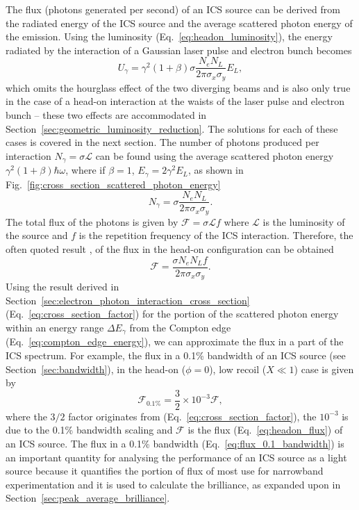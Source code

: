 \documentclass[../main.tex]{subfiles}
\begin{document}
The flux (photons generated per second) of an ICS source can be derived from the radiated energy of the ICS source and the average scattered photon energy of the emission. Using the luminosity (Eq.~\ref{eq:headon_luminosity}), the energy radiated by the interaction of a Gaussian laser pulse and electron bunch becomes  
\begin{equation}
U_{\gamma} = \gamma^{2}\left(1+\beta\right)\sigma\frac{N_{e}N_{L}}{2\pi\sigma_{x}\sigma_{y}}E_{L},
\label{eq:total_interaction_energy_simplified}
\end{equation}
which omits the hourglass effect of the two diverging beams and is also only true in the case of a head-on interaction at the waists of the laser pulse and electron bunch -- these two effects are accommodated in Section~\ref{sec:geometric_luminosity_reduction}. The solutions for each of these cases is covered in the next section. The number of photons produced per interaction $N_{\gamma}=\sigma\mathcal{L}$ can be found using the average scattered photon energy $\gamma^{2}\left(1+\beta\right)\hbar\omega$, where if $\beta=1$, $E_{\gamma} = 2\gamma^{2}E_{L}$, as shown in Fig.~\ref{fig:cross_section_scattered_photon_energy} 
\begin{equation}
N_{\gamma} = \sigma\frac{N_{e}N_{L}}{2\pi\sigma_{x}\sigma_{y}}.
\label{eq:no_photon_headon}
\end{equation}
The total flux of the photons is given by $\mathcal{F} = \sigma\mathcal{L}f$ where $\mathcal{L}$ is the luminosity of the source and $f$ is the repetition frequency of the ICS interaction. Therefore, the often quoted result \cite{krafft2010compton,curatolo2017analytical}, of the flux in the head-on configuration can be obtained
\begin{equation}
\mathcal{F} = \frac{\sigma N_{e}N_{L}f}{2\pi\sigma_{x}\sigma_{y}}.
\label{eq:headon_flux}
\end{equation}
Using the result derived in Section~\ref{sec:electron_photon_interaction_cross_section} (Eq.~\ref{eq:cross_section_factor}) for the portion of the scattered photon energy within an energy range $\Delta E_{\gamma}$ from the Compton edge (Eq.~\ref{eq:compton_edge_energy}), we can approximate the flux in a part of the ICS spectrum. For example, the flux in a 0.1\% bandwidth of an ICS source (see Section~\ref{sec:bandwidth}), in the head-on ($\phi=0$), low recoil ($X \ll 1$) case is given by
\begin{equation}
\mathcal{F}_{0.1\%} = \frac{3}{2}\times 10^{-3} \mathcal{F},
\label{eq:flux_0.1_bandwidth}    
\end{equation}
where the $3/2$ factor originates from (Eq.~\ref{eq:cross_section_factor}), the $10^{-3}$ is due to the 0.1\% bandwidth scaling and $\mathcal{F}$ is the flux (Eq.~\ref{eq:headon_flux}) of an ICS source. The flux in a 0.1\% bandwidth (Eq.~\ref{eq:flux_0.1_bandwidth}) is an important quantity for analysing the performance of an ICS source as a light source because it quantifies the portion of flux of most use for narrowband experimentation and it is used to calculate the brilliance, as expanded upon in Section~\ref{sec:peak_average_brilliance}. 
\end{document}
